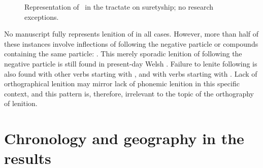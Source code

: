 \begin{figure}[h]
  \centering
  \caption{Representation of \lT\ in the tractate on suretyship; no research exceptions.}
  \label{fig:barchartlaws}
\end{figure}


No manuscript fully represents lenition of  in all cases. However, more than half of these instances involve inflections of  following the negative particle  or compounds containing the same particle: . This merely sporadic lenition of  following the negative particle is still found in present-day Welsh \autocite[695]{thomas_gramadeg_1996}. Failure to lenite following  is also found with other verbs starting with , and with verbs starting with . Lack of orthographical lenition may mirror lack of phonemic lenition in this specific context, and this pattern is, therefore, irrelevant to the topic of the orthography of lenition. 




\section{Chronology and geography in the results}
\label{sec:chronology-laws}

